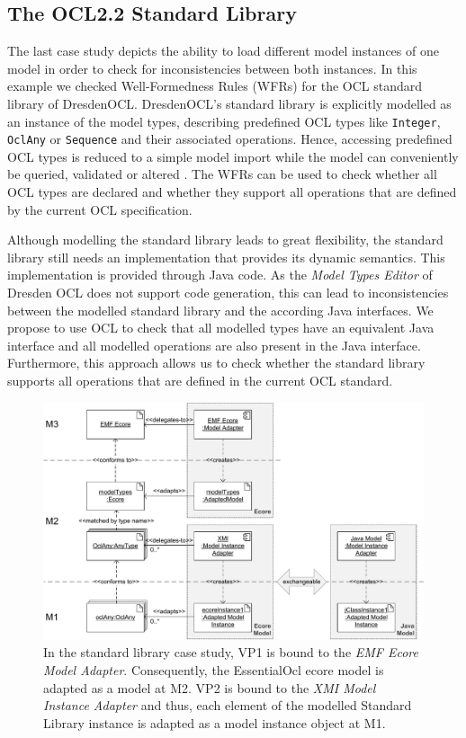 \subsection{The OCL2.2 Standard Library}
The last case study depicts the ability to load different model instances of one model 
in order to check for inconsistencies between both instances. In this example we 
checked Well-Formedness Rules (WFRs) for the OCL standard library of DresdenOCL. 
DresdenOCL's standard library is explicitly modelled as 
an instance of the model types, describing predefined OCL types like \texttt{Integer}, 
\texttt{OclAny} or \texttt{Sequence} and their associated operations. 
Hence, accessing predefined OCL types is reduced to a simple model 
import while the model can conveniently be queried, validated or altered 
\cite{braeuerOCL07}. The WFRs can be used to check whether all OCL types are 
declared and whether they support all operations that are defined by the 
current OCL specification.

Although modelling the standard library leads to great flexibility, the standard library 
still needs an implementation that provides its dynamic semantics. 
This implementation is provided through Java code. As the \textit{Model Types Editor} of Dresden OCL
does not support code generation, this can lead to inconsistencies between 
the modelled standard library and the according Java interfaces.
We propose to use OCL to check that all modelled types have an equivalent Java 
interface and all modelled operations are also present in the Java interface. Furthermore, 
this approach allows us to check whether the standard library supports all operations that 
are defined in the current OCL standard.

\begin{figure}[!t]
	\centering
		\includegraphics[width=1.00\textwidth]{figures/casestudy03.pdf}
	\caption{ 
	In the standard library case study, VP1 is bound to the \textit{EMF Ecore Model Adapter}. 
	  Consequently, the EssentialOcl ecore model is adapted as a model at M2.
	  VP2 is bound to the \textit{XMI Model Instance Adapter} and thus, each element of the modelled Standard Library
	  instance is adapted as a model instance object at M1.}
	\label{fig:casestudy03}
\end{figure}


